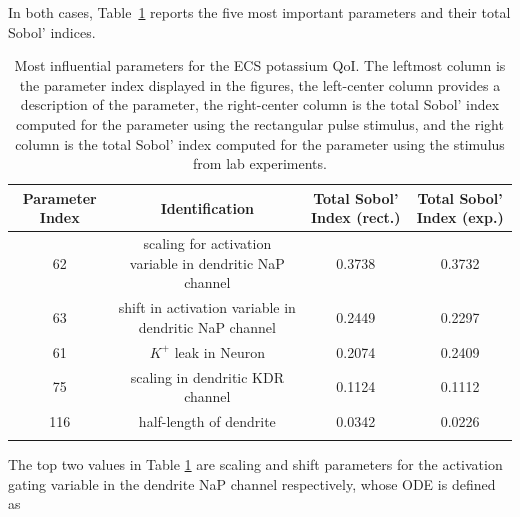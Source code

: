 In both cases, Table~\ref{tab:K_ECS_Mean} reports the five most important parameters and their total Sobol' indices. 


\begin{table}[h]
\centering
{}
\begin{tabular}{cccc}
\toprule
Parameter Index & Identification & Total Sobol' Index (rect.) & Total Sobol' Index (exp.)\\
\midrule
62 & scaling for activation variable in dendritic NaP channel  &  0.3738 & 0.3732\\
63 &  shift in activation variable in dendritic NaP channel &  0.2449 & 0.2297\\
61 & $K^+$ leak in  Neuron &0.2074 & 0.2409\\
75 & scaling in dendritic KDR channel & 0.1124 & 0.1112\\
116 & half-length of dendrite & 0.0342 & 0.0226\\
 \arrayrulecolor{black}\bottomrule
\end{tabular}
\caption{Most influential parameters for the ECS potassium QoI. The leftmost column is the parameter index displayed in the figures, the left-center column provides a description of the parameter, the right-center column is the total Sobol' index computed for the parameter using the rectangular pulse stimulus, and the right column is the total Sobol' index computed for the parameter using the stimulus from lab experiments.}
\label{tab:K_ECS_Mean}
\end{table}
The top two values in Table \ref{tab:K_ECS_Mean} are scaling and shift parameters for the activation gating variable in the dendrite NaP channel respectively, whose ODE is defined as 
